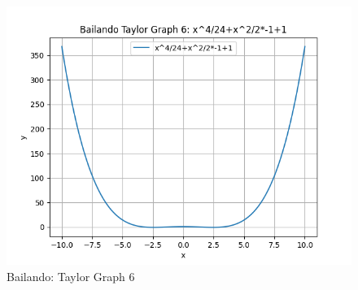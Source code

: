 \documentclass{article}
\begin{document}
\begin{figure}
\centering
\includegraphics[width=0.8\linewidth]{Bailando Taylor Graph 6.png}
\caption{Bailando: Taylor Graph 6}
\label{fig:my_image}
\end{figure}
\end{document}
